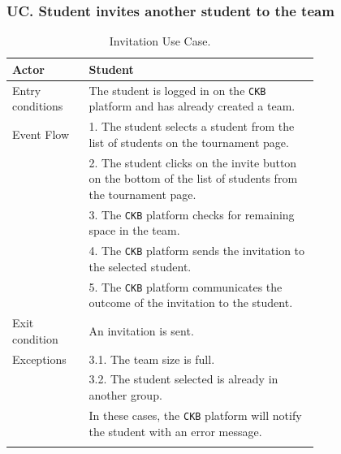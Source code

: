 \subsubsection*{UC\cuc . Student invites another student to the team}
\begin{center}
    \begin{longtable}{lp{0.75\linewidth}}
        \hline
        Actor            & Student                                                                                                                                                                               \\
        \hline
        Entry conditions & The student is logged in on the \verb|CKB| platform and has already created a team.                                                                                                               \\
        \hline
        Event Flow       
        & 1. The student selects a student from the list of students on the tournament page.\\
        & 2. The student clicks on the invite button on the bottom of the list of students from the tournament page.\\
        & 3. The \verb|CKB| platform checks for remaining space in the team.\\
        & 4. The \verb|CKB| platform sends the invitation to the selected student.\\
        & 5. The \verb|CKB| platform communicates the outcome of the invitation to the student.\\
        \hline
        Exit condition   & An invitation is sent.   \\                                                                                                                                                                           
        \hline
        Exceptions   
        & 3.1. The team size is full.\\ 
        & 3.2. The student selected is already in another group.\\                                         
            & In these cases, the \verb|CKB| platform will notify the student with an error message.\\                                                               
        \hline
        \caption{Invitation Use Case.}
        \label{tab: invitation_use_case}
    \end{longtable}


\end{center}
